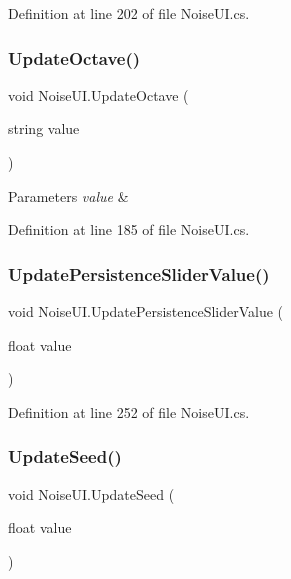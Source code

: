 Definition at line 202 of file Noise\+U\+I.\+cs.

\mbox{\label{class_noise_u_i_a83a83abd3f755eec38bd239d3499f3b1}} 
\subsubsection{Update\+Octave()}
{\footnotesize\ttfamily void Noise\+U\+I.\+Update\+Octave (\begin{DoxyParamCaption}\item[{string}]{value }\end{DoxyParamCaption})}






\begin{DoxyParams}{Parameters}
{\em value} & \\
\hline
\end{DoxyParams}


Definition at line 185 of file Noise\+U\+I.\+cs.

\mbox{\label{class_noise_u_i_adc95c5f657fb74a6cad0d22da8e26642}} 
\subsubsection{Update\+Persistence\+Slider\+Value()}
{\footnotesize\ttfamily void Noise\+U\+I.\+Update\+Persistence\+Slider\+Value (\begin{DoxyParamCaption}\item[{float}]{value }\end{DoxyParamCaption})}



Definition at line 252 of file Noise\+U\+I.\+cs.

\mbox{\label{class_noise_u_i_a3b2a96d6fc063376c7f9fb7d98da3571}} 
\subsubsection{Update\+Seed()}
{\footnotesize\ttfamily void Noise\+U\+I.\+Update\+Seed (\begin{DoxyParamCaption}\item[{float}]{value }\end{DoxyParamCaption})}



